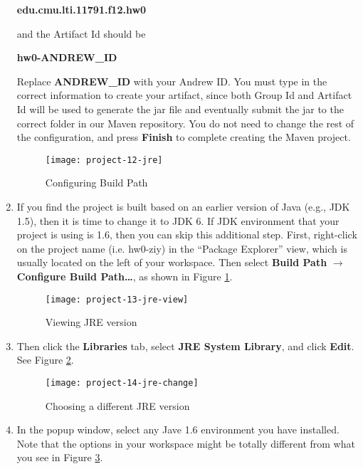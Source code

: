 \begin{enumerate}
\begin{center}
\textbf{edu.cmu.lti.11791.f12.hw0}
\end{center}

and the Artifact Id should be

\begin{center}
\textbf{hw0-ANDREW\_ID}
\end{center}

Replace \textbf{ANDREW\_ID} with your Andrew ID. You must type in the correct information to create your artifact, since both Group Id and Artifact Id will be used to generate the jar file and eventually submit the jar to the correct folder in our Maven repository. You do not need to change the rest of the configuration, and press \textbf{Finish} to complete creating the Maven project.

\begin{figure}[t]
\centering
\texttt{[image: project-12-jre]}
\caption{Configuring Build Path\label{project-12-jre}}
\end{figure}

\item If you find the project is built based on an earlier version of Java (e.g., JDK 1.5), then it is time to change it to JDK 6. If JDK environment that your project is using is 1.6, then you can skip this additional step. First, right-click on the project name (i.e. hw0-ziy) in the ``Package Explorer'' view, which is usually located on the left of your workspace. Then select \textbf{Build Path} $\rightarrow$ \textbf{Configure Build Path\ldots}, as shown in Figure \ref{project-12-jre}.

\begin{figure}[t]
\centering
\texttt{[image: project-13-jre-view]}
\caption{Viewing JRE version\label{project-13-jre-view}}
\end{figure}

\item Then click the \textbf{Libraries} tab, select \textbf{JRE System Library}, and click \textbf{Edit}. See Figure \ref{project-13-jre-view}.

\begin{figure}[t]
\centering
\texttt{[image: project-14-jre-change]}
\caption{Choosing a different JRE version\label{project-14-jre-change}}
\end{figure}

\item In the popup window, select any Jave 1.6 environment you have installed. Note that the options in your workspace might be totally different from what you see in Figure \ref{project-14-jre-change}.

\end{enumerate}

